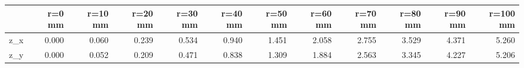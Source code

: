 \documentclass[convert={convertexe={magick.exe}}]{standalone}
\begin{document}
\begin{tabular}{lrrrrrrrrrrr}
\toprule
{} &  r=0 mm &  r=10 mm &  r=20 mm &  r=30 mm &  r=40 mm &  r=50 mm &  r=60 mm &  r=70 mm &  r=80 mm &  r=90 mm &  r=100 mm \\
\midrule
z\_x &   0.000 &    0.060 &    0.239 &    0.534 &    0.940 &    1.451 &    2.058 &    2.755 &    3.529 &    4.371 &     5.260 \\
z\_y &   0.000 &    0.052 &    0.209 &    0.471 &    0.838 &    1.309 &    1.884 &    2.563 &    3.345 &    4.227 &     5.206 \\
\bottomrule
\end{tabular}
\end{document}
